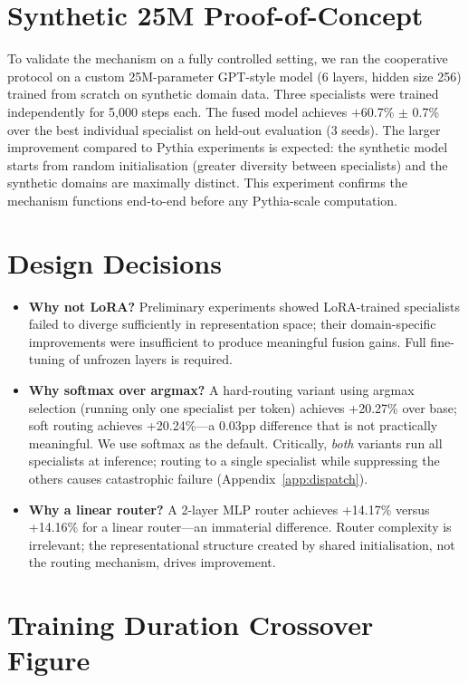 \documentclass{article}
\begin{document}
\section{Synthetic 25M Proof-of-Concept}
\label{app:synthetic}

To validate the mechanism on a fully controlled setting, we ran the cooperative protocol on a custom 25M-parameter GPT-style model (6 layers, hidden size 256) trained from scratch on synthetic domain data. Three specialists were trained independently for 5,000 steps each. The fused model achieves $+$60.7\% $\pm$ 0.7\% over the best individual specialist on held-out evaluation (3 seeds). The larger improvement compared to Pythia experiments is expected: the synthetic model starts from random initialisation (greater diversity between specialists) and the synthetic domains are maximally distinct. This experiment confirms the mechanism functions end-to-end before any Pythia-scale computation.

\section{Design Decisions}
\label{app:design}

\begin{itemize}[leftmargin=*, itemsep=4pt]
  \item \textbf{Why not LoRA?} Preliminary experiments showed LoRA-trained specialists failed to diverge sufficiently in representation space; their domain-specific improvements were insufficient to produce meaningful fusion gains. Full fine-tuning of unfrozen layers is required.
  \item \textbf{Why softmax over argmax?} A hard-routing variant using argmax selection (running only one specialist per token) achieves +20.27\% over base; soft routing achieves +20.24\%---a 0.03pp difference that is not practically meaningful. We use softmax as the default. Critically, \emph{both} variants run all specialists at inference; routing to a single specialist while suppressing the others causes catastrophic failure (Appendix~\ref{app:dispatch}).
  \item \textbf{Why a linear router?} A 2-layer MLP router achieves +14.17\% versus +14.16\% for a linear router---an immaterial difference. Router complexity is irrelevant; the representational structure created by shared initialisation, not the routing mechanism, drives improvement.
\end{itemize}

\section{Training Duration Crossover Figure}
\label{app:crossoverfig}
\end{document}
